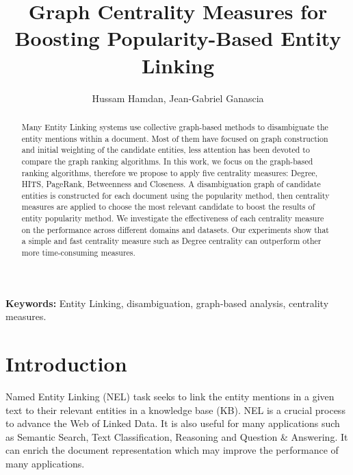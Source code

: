 \documentclass{llncs}
\begin{document}
\title{Graph Centrality Measures for Boosting  Popularity-Based Entity  Linking}
\author{Hussam Hamdan, Jean-Gabriel Ganascia }

\maketitle
\begin{abstract}

  Many Entity Linking systems use collective graph-based methods  to disambiguate the entity mentions within a document. Most of them have focused on graph construction and initial weighting of the candidate entities, less attention has been devoted to compare the graph ranking algorithms. In this work, we focus on the graph-based ranking algorithms, therefore we propose to apply five centrality measures: Degree, HITS, PageRank, Betweenness and Closeness. A disambiguation graph of candidate entities is constructed for each document using the popularity method, then  centrality measures are applied to choose the most relevant candidate to boost the results of entity popularity method. We investigate the effectiveness of each centrality measure  on the performance across different domains and datasets. Our experiments show that a simple and fast centrality measure such as Degree centrality can outperform other more time-consuming measures.
\end{abstract}

\textbf{Keywords:} Entity Linking,  disambiguation, graph-based analysis, centrality measures.

\section{Introduction}

Named Entity Linking (NEL) task seeks to link the entity mentions in a given text to their relevant entities in a knowledge base (KB).  NEL is  a crucial process   to advance the Web of Linked Data.  It is also useful for many  applications  such as Semantic Search, Text Classification, Reasoning and Question \& Answering. It can enrich the document representation which may improve the performance of many applications.
\end{document}
